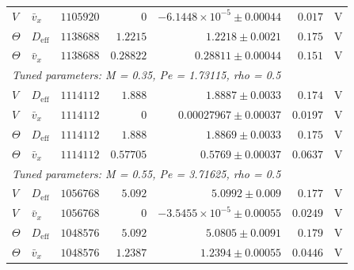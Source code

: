 \begin{longtable}{llrrrrc}
$V$ & $\bar v_x$ & $1105920$ & $0$ & $-6.1448\times10^{-5} \pm 0.00044$ & $0.017$ & V \\
$\Theta$ & $D_{\mathrm{eff}}$ & $1138688$ & $1.2215$ & $1.2218 \pm 0.0021$ & $0.175$ & V \\
$\Theta$ & $\bar v_x$ & $1138688$ & $0.28822$ & $0.28811 \pm 0.00044$ & $0.151$ & V \\
\multicolumn{7}{l}{\textit{Tuned parameters: M = 0.35, Pe = 1.73115, rho = 0.5}} \\
$V$ & $D_{\mathrm{eff}}$ & $1114112$ & $1.888$ & $1.8887 \pm 0.0033$ & $0.174$ & V \\
$V$ & $\bar v_x$ & $1114112$ & $0$ & $0.00027967 \pm 0.00037$ & $0.0197$ & V \\
$\Theta$ & $D_{\mathrm{eff}}$ & $1114112$ & $1.888$ & $1.8869 \pm 0.0033$ & $0.175$ & V \\
$\Theta$ & $\bar v_x$ & $1114112$ & $0.57705$ & $0.5769 \pm 0.00037$ & $0.0637$ & V \\
\multicolumn{7}{l}{\textit{Tuned parameters: M = 0.55, Pe = 3.71625, rho = 0.5}} \\
$V$ & $D_{\mathrm{eff}}$ & $1056768$ & $5.092$ & $5.0992 \pm 0.009$ & $0.177$ & V \\
$V$ & $\bar v_x$ & $1056768$ & $0$ & $-3.5455\times10^{-5} \pm 0.00055$ & $0.0249$ & V \\
$\Theta$ & $D_{\mathrm{eff}}$ & $1048576$ & $5.092$ & $5.0805 \pm 0.0091$ & $0.179$ & V \\
$\Theta$ & $\bar v_x$ & $1048576$ & $1.2387$ & $1.2394 \pm 0.00055$ & $0.0446$ & V \\
\hline
\end{longtable}
\endgroup
